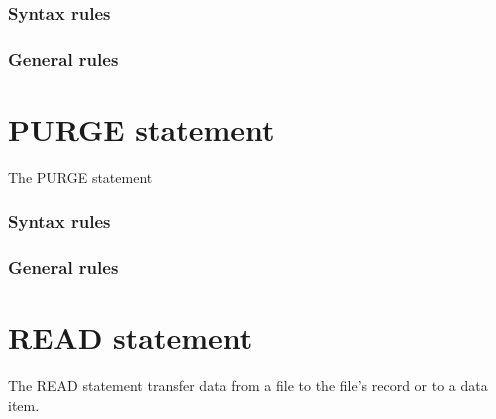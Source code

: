 
\subsubsection{Syntax rules}

\subsubsection{General rules}

\section{PURGE statement}

The PURGE statement

\begin{syntax}[\deletedcolour]
\end{syntax}

\subsubsection{Syntax rules}

\subsubsection{General rules}

\section{READ statement}

The READ statement transfer data from a file to the file's record or to a data item.

